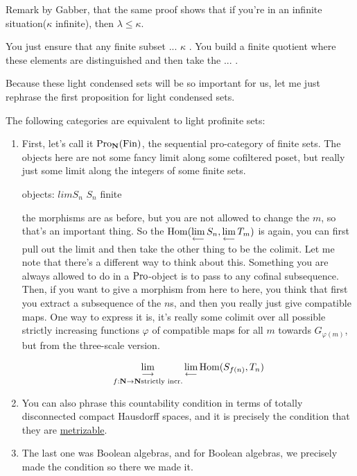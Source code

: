 \begin{remark}
Remark by Gabber, that the same proof shows that if you're in an infinite situation($\kappa$ infinite), then $\lambda \leq \kappa$.
\end{remark}

You just ensure that any finite subset ... $\kappa$ . You build a finite quotient where these elements are distinguished and then take the ... .

Because these light condensed sets will be so important for us, let me just rephrase the first proposition for light condensed sets. 

\begin{proposition}
The following categories are equivalent to light profinite sets:
\begin{enumerate}
\item First, let's call it $\operatorname{Pro}_\mathbf N(\operatorname{Fin})$, the sequential pro-category of finite sets. The objects here are not some fancy limit along some cofiltered poset, but really just some limit along the integers of some finite sets. 

objects: $lim S_n$ $S_n$ finite

the morphisms are as before, but you are not allowed to change the $m$, so that's an important thing. So the $\operatorname{Hom}(\mathop{\operatorname*{lim}\limits_{\longleftarrow}}\limits S_n, \mathop{\operatorname*{lim}\limits_{\longleftarrow}}\limits T_m)$ is again, you can first pull out the limit and then take the other thing to be the colimit. 
Let me note that there's a different way to think about this. Something you are always allowed to do in a $\operatorname{Pro}$-object is to pass to any cofinal subsequence. Then, if you want to give a morphism from here to here, you think that first you extract a subsequence of the $n$s, and then you really just give compatible maps. One way to express it is, it's really some colimit over all possible strictly increasing functions $\varphi$ of compatible maps for all $m$ towards $G_{\varphi(m)}$, but from the three-scale version.

\begin{align*}
\mathop{\operatorname*{lim}\limits_{\longrightarrow}}\limits_{f: \mathbf N \to \mathbf N \text{strictly incr.}} \mathop{\operatorname*{lim}\limits_{\longleftarrow}}\limits \operatorname{Hom}(S_{f(n)}, T_n)
\end{align*}


\item You can also phrase this countability condition in terms of totally disconnected compact Hausdorff spaces, and it is precisely the condition that they are \underline{metrizable}. 

\item The last one was Boolean algebras, and for Boolean algebras, we precisely made the condition so there we made it.

\end{enumerate}

\end{proposition}

